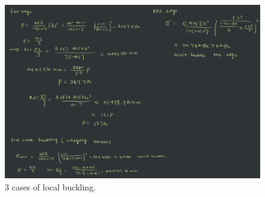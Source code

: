 \documentclass{article}
\begin{document}
\begin{figure}[H]
    \centering
    \includegraphics[width=\textwidth]{localbuckling.png}
    \caption{3 cases of local buckling.}
\end{figure}
\end{document}
